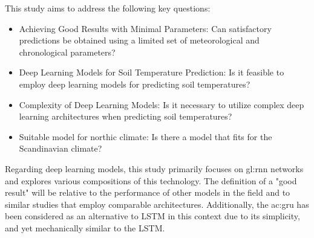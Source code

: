 This study aims to address the following key questions:
\begin{itemize}
	\item Achieving Good Results with Minimal Parameters: Can satisfactory predictions be obtained using a limited set of meteorological and chronological parameters?
	
	\item Deep Learning Models for Soil Temperature Prediction: Is it feasible to employ deep learning models for predicting soil temperatures?
	
	\item Complexity of Deep Learning Models: Is it necessary to utilize complex deep learning architectures when predicting soil temperatures?
	
	\item Suitable model for northic climate: Is there a model that fits for the Scandinavian climate?
\end{itemize}

Regarding deep learning models, this study primarily focuses on \gls{gl:rnn} networks and explores various compositions of this technology. The definition of a "good result" will be relative to the performance of other models in the field and to similar studies that employ comparable architectures. Additionally, the \acrfull{ac:gru} has been considered as an alternative to LSTM in this context due to its simplicity, and yet mechanically similar to the LSTM.
